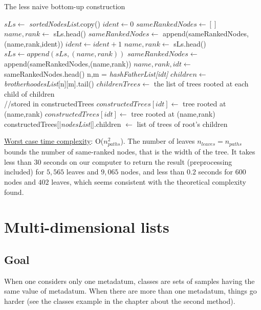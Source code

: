 \documentclass{report}
\begin{document}
\begin{algorithm}
\caption{The less naive bottom-up construction}
\begin{algorithmic}
\STATE $sLs \leftarrow $ \emph{sortedNodesList}.copy()
\STATE $ident \leftarrow 0$
\STATE $sameRankedNodes \leftarrow []$
\STATE $name,rank \leftarrow $ sLs.head()
\STATE $sameRankedNodes \leftarrow $ append(sameRankedNodes,(name,rank,ident))
\STATE $ident \leftarrow ident + 1$
\STATE $name,rank \leftarrow $ sLs.head()
\ENDIF
\ENDWHILE
\STATE $sLs \leftarrow append(sLs,(name,rank)) $
\STATE $sameRankedNodes \leftarrow $ append(sameRankedNodes,(name,rank))
\ENDIF
{}
\STATE $name,rank,idt \leftarrow $ sameRankedNodes.head()
\STATE n,m = \emph{hashFatherList[idt]}
\STATE $children \leftarrow $ \emph{brotherhoodesList}[n][m].tail()
\STATE $childrenTrees \leftarrow $ the list of trees rooted at each child of children \\
//stored in constructedTrees
\STATE $constructedTrees[idt] \leftarrow $ tree rooted at (name,rank) 
\ELSE
\STATE $constructedTrees[idt] \leftarrow $ tree rooted at (name,rank)
\ENDIF
\ENDWHILE
\ENDFOR
\STATE constructedTrees[|\emph{nodesList}|].children $ \leftarrow $ list of trees of root's children
\end{algorithmic}
\end{algorithm}

\uline{Worst case time complexity}: O($n_{paths}^{2}$). The number of leaves $n_{leaves} = n_{paths}$ bounds the number of same-ranked nodes, that is the width of the tree. It takes less than $30$ seconds on our computer to return the result (preprocessing included) for $5,565$ leaves and $9,065$ nodes, and less than $0.2$ seconds for $600$ nodes and $402$ leaves, which seems consistent with the theoretical complexity found. \\

\chapter{Multi-dimensional lists}

\section{Goal}

When one considers only one metadatum, classes are sets of samples having the same value of metadatum. When there are more than one metadatum, things go harder (see the classes example in the chapter about the second method).
\end{document}
